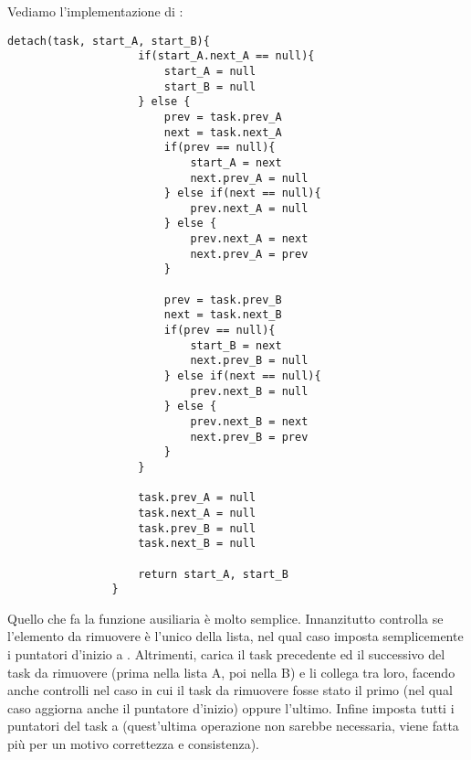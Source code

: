         Vediamo l'implementazione di :
        
        \begin{center}
            \begin{lstlisting}[language=pseudo, gobble=14]
                detach(task, start_A, start_B){
                    if(start_A.next_A == null){
                        start_A = null
                        start_B = null
                    } else {
                        prev = task.prev_A
                        next = task.next_A
                        if(prev == null){
                            start_A = next
                            next.prev_A = null
                        } else if(next == null){
                            prev.next_A = null
                        } else {
                            prev.next_A = next
                            next.prev_A = prev
                        }
                        
                        prev = task.prev_B
                        next = task.next_B
                        if(prev == null){
                            start_B = next
                            next.prev_B = null
                        } else if(next == null){
                            prev.next_B = null
                        } else {
                            prev.next_B = next
                            next.prev_B = prev
                        }
                    }
                    
                    task.prev_A = null
                    task.next_A = null
                    task.prev_B = null
                    task.next_B = null
                    
                    return start_A, start_B
                }\end{lstlisting}
        \end{center}
        
        Quello che fa la funzione ausiliaria  è molto semplice. Innanzitutto controlla se l'elemento da rimuovere è l'unico della lista, nel qual caso imposta semplicemente i puntatori d'inizio a . Altrimenti, carica il task precedente ed il successivo del task da rimuovere (prima nella lista A, poi nella B) e li collega tra loro, facendo anche controlli nel caso in cui il task da rimuovere fosse stato il primo (nel qual caso aggiorna anche il puntatore d'inizio) oppure l'ultimo. Infine imposta tutti i puntatori del task a  (quest'ultima operazione non sarebbe necessaria, viene fatta più per un motivo correttezza e consistenza).
        
